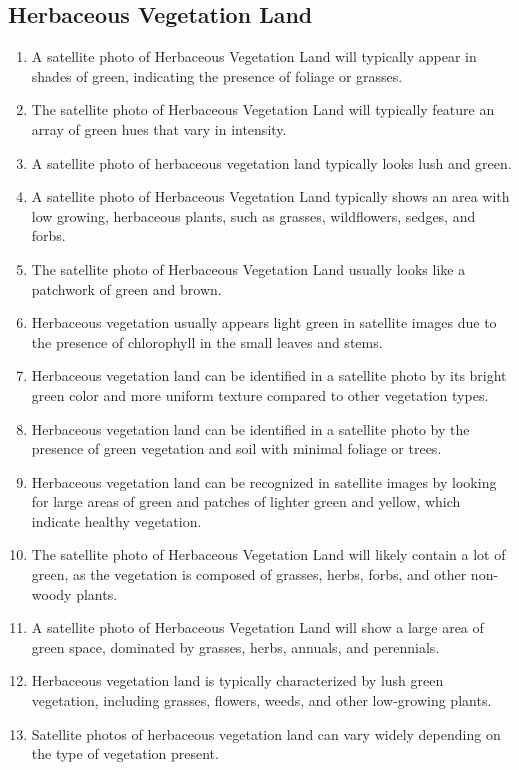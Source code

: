 \documentclass[11pt]{article}
\begin{document}
\subsection{Herbaceous Vegetation Land}
\begin{enumerate}
\item A satellite photo of Herbaceous Vegetation Land will typically appear in shades of green, indicating the presence of foliage or grasses.
\item The satellite photo of Herbaceous Vegetation Land will typically feature an array of green hues that vary in intensity.
\item A satellite photo of herbaceous vegetation land typically looks lush and green.
\item A satellite photo of Herbaceous Vegetation Land typically shows an area with low growing, herbaceous plants, such as grasses, wildflowers, sedges, and forbs.
\item The satellite photo of Herbaceous Vegetation Land usually looks like a patchwork of green and brown.
\item Herbaceous vegetation usually appears light green in satellite images due to the presence of chlorophyll in the small leaves and stems.
\item Herbaceous vegetation land can be identified in a satellite photo by its bright green color and more uniform texture compared to other vegetation types.
\item Herbaceous vegetation land can be identified in a satellite photo by the presence of green vegetation and soil with minimal foliage or trees.
\item Herbaceous vegetation land can be recognized in satellite images by looking for large areas of green and patches of lighter green and yellow, which indicate healthy vegetation.
\item The satellite photo of Herbaceous Vegetation Land will likely contain a lot of green, as the vegetation is composed of grasses, herbs, forbs, and other non-woody plants.
\item A satellite photo of Herbaceous Vegetation Land will show a large area of green space, dominated by grasses, herbs, annuals, and perennials.
\item Herbaceous vegetation land is typically characterized by lush green vegetation, including grasses, flowers, weeds, and other low-growing plants.
\item Satellite photos of herbaceous vegetation land can vary widely depending on the type of vegetation present.

\end{enumerate}
\end{document}
